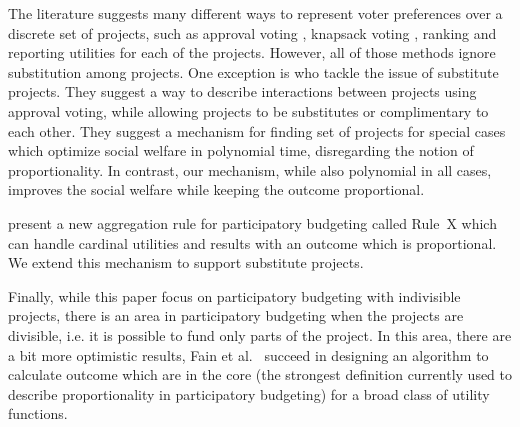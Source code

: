 \documentclass[runningheads]{llncs}
\begin{document}
The literature suggests many different ways to 
represent voter preferences over a discrete set of projects, such as approval voting \cite{aziz2020participatory, aziz2017proportionally}, knapsack voting \cite{goel2019knapsack, goel2016knapsack, fluschnik2019fair}, ranking \cite{aziz2020expanding, benade2020preference} and reporting utilities \cite{peters2020proportional} for each of the projects. However, all of those methods ignore substitution among projects. %
One exception is \citet{jain2020participatory} who tackle the issue of substitute projects. They suggest a way to describe  interactions between projects using approval voting, while allowing 
projects to be  substitutes  or complimentary to each other. 
They suggest a mechanism for finding set of  projects for special cases which  optimize social welfare in polynomial time, disregarding the notion of proportionality. In contrast, our mechanism, while 
also polynomial in all cases,    improves the social welfare while keeping the outcome proportional. %

 \citet{peters2020proportional}  present a new aggregation rule for participatory budgeting called Rule~X which can handle cardinal utilities and results with an outcome which is proportional.  We  extend this mechanism to support substitute projects.
 
Finally, while  this paper focus on participatory budgeting with indivisible projects, there is an area in participatory budgeting when the projects are divisible, i.e. it is possible to fund only parts of the project. In this area, there are a bit more optimistic results, Fain et al.~\cite{fain2018fair} succeed in designing an algorithm to calculate outcome which are in the core (the strongest definition currently used to describe proportionality in participatory budgeting) for a broad class of utility functions.


\end{document}
